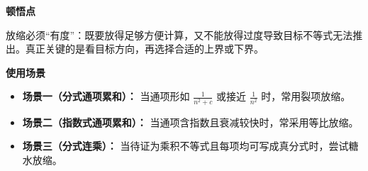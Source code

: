 \begin{explanationbox}
	\medskip
	\textbf{\textcolor{CExplanation}{顿悟点}}

	放缩必须“有度”：既要放得足够方便计算，又不能放得过度导致目标不等式无法推出。真正关键的是看目标方向，再选择合适的上界或下界。

	\medskip
	\textbf{\textcolor{CExplanation}{使用场景}}
	\begin{itemize}[leftmargin=*, itemsep=0.5em, topsep=0.4em]
		\item \textbf{场景一（分式通项累和）：} 当通项形如 $\frac{1}{n^2+c}$ 或接近 $\frac1{n^2}$ 时，常用裂项放缩。
		\item \textbf{场景二（指数式通项累和）：} 当通项含指数且衰减较快时，常采用等比放缩。
		\item \textbf{场景三（分式连乘）：} 当待证为乘积不等式且每项均可写成真分式时，尝试糖水放缩。
	\end{itemize}
\end{explanationbox}